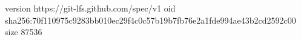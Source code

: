 version https://git-lfs.github.com/spec/v1
oid sha256:70f110975c9283bb010ec29f4c0c57b19b7fb76e2a1fde994ae43b2cd2592c00
size 87536
